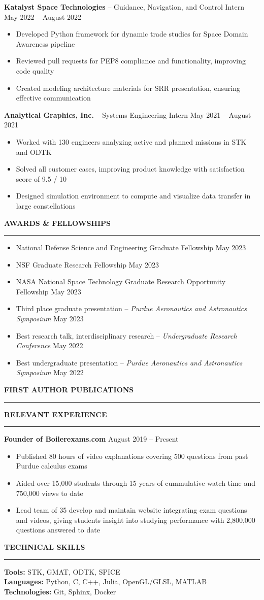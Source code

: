 \documentclass[11pt, a4paper]{article}
\newcommand{\sectiontitle}[1]{{\Large \textbf{#1}}\vspace{0.5em}\hrule\vspace{0.5em}}
\begin{document}
\textbf{Katalyst Space Technologies} -- Guidance, Navigation, and Control Intern \hfill May 2022 -- August 2022
\begin{itemize}[noitemsep]
    \item Developed Python framework for dynamic trade studies for Space Domain Awareness pipeline
    \item Reviewed pull requests for PEP8 compliance and functionality, improving code quality
    \item Created modeling architecture materials for SRR presentation, ensuring effective communication
\end{itemize}

\textbf{Analytical Graphics, Inc.} -- Systems Engineering Intern \hfill May 2021 -- August 2021
\begin{itemize}[noitemsep]
    \item Worked with 130 engineers analyzing active and planned missions in STK and ODTK
    \item Solved all customer cases, improving product knowledge with satisfaction score of 9.5 / 10
    \item Designed simulation environment to compute and visualize data transfer in large constellations
\end{itemize}

\sectiontitle{AWARDS \& FELLOWSHIPS}
\begin{itemize}[noitemsep]
    \item National Defense Science and Engineering Graduate Fellowship \hfill May 2023
    \item NSF Graduate Research Fellowship \hfill May 2023
    \item NASA National Space Technology Graduate Research Opportunity Fellowship \hfill May 2023
    \item Third place graduate presentation -- \textit{Purdue Aeronautics and Astronautics Symposium} \hfill May 2023
    \item Best research talk, interdisciplinary research -- \textit{Undergraduate Research Conference} \hfill May 2022
    \item Best undergraduate presentation -- \textit{Purdue Aeronautics and Astronautics Symposium} \hfill May 2022
\end{itemize}

\sectiontitle{FIRST AUTHOR PUBLICATIONS}
\nocite{*}
\printbibliography[heading=none]


\sectiontitle{RELEVANT EXPERIENCE}
\textbf{Founder of Boilerexams.com} \hfill August 2019 -- Present
\begin{itemize}[noitemsep]
    \item Published 80 hours of video explanations covering 500 questions from past Purdue calculus exams
    \item Aided over 15,000 students through 15 years of cummulative watch time and 750,000 views to date
    \item Lead team of 35 develop and maintain website integrating exam questions and videos, giving students
    insight into studying performance with 2,800,000 questions answered to date
\end{itemize}

\sectiontitle{TECHNICAL SKILLS}
\textbf{Tools:} STK, GMAT, ODTK, SPICE \\
\textbf{Languages:} Python, C, C++, Julia, OpenGL/GLSL, MATLAB \\
\textbf{Technologies:} Git, Sphinx, Docker
\end{document}
